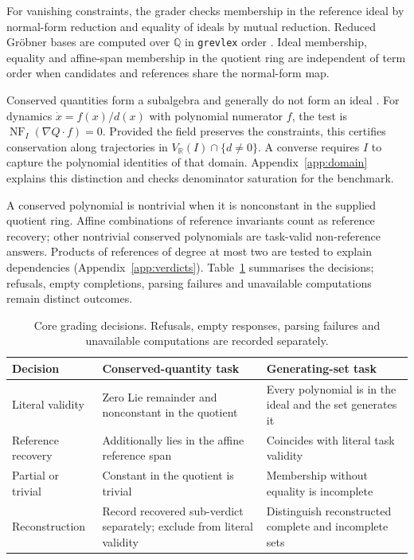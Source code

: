 \documentclass[10pt]{article}
\newcommand{\NF}{\operatorname{NF}}
\newcommand{\Q}{\mathbb{Q}}
\newcommand{\R}{\mathbb{R}}
\begin{document}
For vanishing constraints, the grader checks membership in the reference ideal by normal-form reduction and equality of ideals by mutual reduction. Reduced Gr\"obner bases are computed over $\Q$ in \texttt{grevlex} order \citep{cox2015ideals}. Ideal membership, equality and affine-span membership in the quotient ring are independent of term order when candidates and references share the normal-form map.

Conserved quantities form a subalgebra and generally do not form an ideal \citep{gebrekidan2026diagnosing}. For dynamics $\dot x=f(x)/d(x)$ with polynomial numerator $f$, the test is $\NF_I(\nabla Q\cdot f)=0$. Provided the field preserves the constraints, this certifies conservation along trajectories in $V_\R(I)\cap\{d\ne0\}$. A converse requires $I$ to capture the polynomial identities of that domain. Appendix~\ref{app:domain} explains this distinction and checks denominator saturation for the benchmark.

A conserved polynomial is nontrivial when it is nonconstant in the supplied quotient ring. Affine combinations of reference invariants count as reference recovery; other nontrivial conserved polynomials are task-valid non-reference answers. Products of references of degree at most two are tested to explain dependencies (Appendix~\ref{app:verdicts}). Table~\ref{tab:decisions} summarises the decisions; refusals, empty completions, parsing failures and unavailable computations remain distinct outcomes.

\begin{table}[!htbp]
\centering\small
\begin{tabularx}{\textwidth}{@{}p{2.5cm}XX@{}}
\toprule
Decision & Conserved-quantity task & Generating-set task \\
\midrule
Literal validity & Zero Lie remainder and nonconstant in the quotient & Every polynomial is in the ideal and the set generates it \\
Reference recovery & Additionally lies in the affine reference span & Coincides with literal task validity \\
Partial or trivial & Constant in the quotient is trivial & Membership without equality is incomplete \\
Reconstruction & Record recovered sub-verdict separately; exclude from literal validity & Distinguish reconstructed complete and incomplete sets \\
\bottomrule
\end{tabularx}
\caption{Core grading decisions. Refusals, empty responses, parsing failures and unavailable computations are recorded separately.}
\label{tab:decisions}
\end{table}
\end{document}
